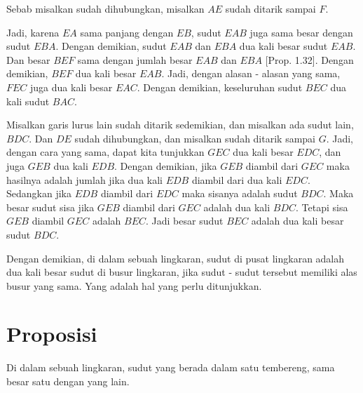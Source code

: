 \documentclass[a4paper]{book}
\begin{document}
Sebab misalkan sudah dihubungkan, misalkan $AE$ sudah ditarik sampai $F$.

Jadi, karena $EA$ sama panjang dengan $EB$, sudut $EAB$ juga sama besar
dengan sudut $EBA$. Dengan demikian, sudut $EAB$ dan $EBA$ dua kali besar 
sudut $EAB$. Dan besar $BEF$ sama dengan jumlah besar $EAB$ dan $EBA$ 
[Prop. 1.32]. Dengan demikian, $BEF$ dua kali besar $EAB$. Jadi, dengan alasan 
- alasan yang sama, $FEC$ juga dua kali besar $EAC$. Dengan demikian, 
keseluruhan sudut $BEC$ dua kali sudut $BAC$.

Misalkan garis lurus lain sudah ditarik sedemikian, dan misalkan ada sudut lain,
 $BDC$. Dan $DE$ sudah dihubungkan, dan misalkan sudah ditarik sampai $G$.
Jadi, dengan cara yang sama, dapat kita tunjukkan $GEC$ dua kali besar $EDC$,
 dan juga $GEB$ dua kali $EDB$. Dengan demikian, jika $GEB$ diambil dari $GEC$
maka hasilnya adalah jumlah jika dua kali $EDB$ diambil dari dua kali $EDC$. 
Sedangkan jika $EDB$ diambil dari $EDC$ maka sisanya adalah sudut $BDC$. Maka
besar sudut sisa jika $GEB$ diambil dari $GEC$ adalah dua kali $BDC$. Tetapi 
sisa $GEB$ diambil $GEC$ adalah $BEC$. Jadi besar sudut $BEC$ adalah dua kali 
besar sudut $BDC$.

Dengan demikian, di dalam sebuah lingkaran, sudut di pusat lingkaran adalah
dua kali besar sudut di busur lingkaran, jika sudut - sudut tersebut memiliki
alas busur yang sama. Yang adalah hal yang perlu ditunjukkan.

\section*{\centering Proposisi \thesection}
Di dalam sebuah lingkaran, sudut yang berada dalam satu tembereng, sama besar
satu dengan yang lain. 
\begin{center}
\end{center}
\end{document}
